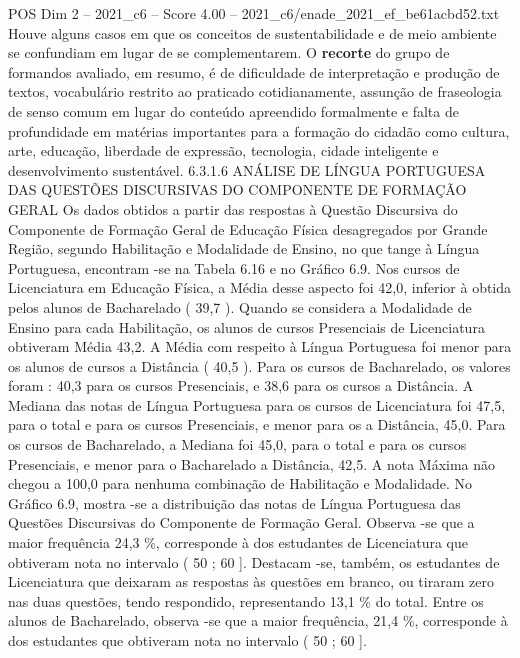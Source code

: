 \begin{textsample}{POS Dim 2 – 2021\_c6 – Score 4.00 – 2021\_c6/enade\_2021\_ef\_be61acbd52.txt}
Houve alguns casos em que os conceitos de sustentabilidade e de meio ambiente se confundiam em lugar de se complementarem.
O \textbf{recorte} do grupo de formandos avaliado, em resumo, é de dificuldade de interpretação e produção de textos, vocabulário restrito ao praticado cotidianamente, assunção de fraseologia de senso comum em lugar do conteúdo apreendido formalmente e falta de profundidade em matérias importantes para a formação do cidadão como cultura, arte, educação, liberdade de expressão, tecnologia, cidade inteligente e desenvolvimento sustentável. 6.3.1.6 ANÁLISE DE LÍNGUA PORTUGUESA DAS QUESTÕES DISCURSIVAS DO COMPONENTE DE FORMAÇÃO GERAL Os dados obtidos a partir das respostas à Questão Discursiva do Componente de Formação Geral de Educação Física desagregados por Grande Região, segundo Habilitação e Modalidade de Ensino, no que tange à Língua Portuguesa, encontram -se na Tabela 6.16 e no Gráfico 6.9.
Nos cursos de Licenciatura em Educação Física, a Média desse aspecto foi 42,0, inferior à obtida pelos alunos de Bacharelado ( 39,7 ).
Quando se considera a Modalidade de Ensino para cada Habilitação, os alunos de cursos Presenciais de Licenciatura obtiveram Média 43,2.
A Média com respeito à Língua Portuguesa foi menor para os alunos de cursos a Distância ( 40,5 ).
Para os cursos de Bacharelado, os valores foram : 40,3 para os cursos Presenciais, e 38,6 para os cursos a Distância.
A Mediana das notas de Língua Portuguesa para os cursos de Licenciatura foi 47,5, para o total e para os cursos Presenciais, e menor para os a Distância, 45,0.
Para os cursos de Bacharelado, a Mediana foi 45,0, para o total e para os cursos Presenciais, e menor para o Bacharelado a Distância, 42,5.
A nota Máxima não chegou a 100,0 para nenhuma combinação de Habilitação e Modalidade.
No Gráfico 6.9, mostra -se a distribuição das notas de Língua Portuguesa das Questões Discursivas do Componente de Formação Geral.
Observa -se que a maior frequência 24,3 \%, corresponde à dos estudantes de Licenciatura que obtiveram nota no intervalo ( 50 ; 60 ].
Destacam -se, também, os estudantes de Licenciatura que deixaram as respostas às questões em branco, ou tiraram zero nas duas questões, tendo respondido, representando 13,1 \% do total.
Entre os alunos de Bacharelado, observa -se que a maior frequência, 21,4 \%, corresponde à dos estudantes que obtiveram nota no intervalo ( 50 ; 60 ].

\end{textsample}

